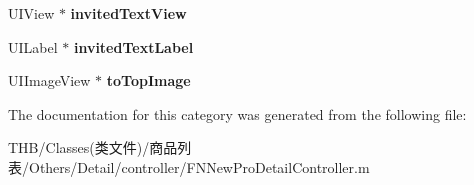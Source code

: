 \begin{DoxyCompactItemize}
\mbox{\label{category_f_n_new_pro_detail_controller_07_08_a9316e40322c96ca2feb739de1b6c78ab}} 
U\+I\+View $\ast$ {\bfseries invited\+Text\+View}
\item 
\mbox{\label{category_f_n_new_pro_detail_controller_07_08_a155f203933b1411d783b017afc4d5daf}} 
U\+I\+Label $\ast$ {\bfseries invited\+Text\+Label}
\item 
\mbox{\label{category_f_n_new_pro_detail_controller_07_08_ac1db8dd2cac35db18edbafa20ea5f4be}} 
U\+I\+Image\+View $\ast$ {\bfseries to\+Top\+Image}
\end{DoxyCompactItemize}


The documentation for this category was generated from the following file\+:\begin{DoxyCompactItemize}
\item 
T\+H\+B/\+Classes(类文件)/商品列表/\+Others/\+Detail/controller/F\+N\+New\+Pro\+Detail\+Controller.\+m\end{DoxyCompactItemize}
